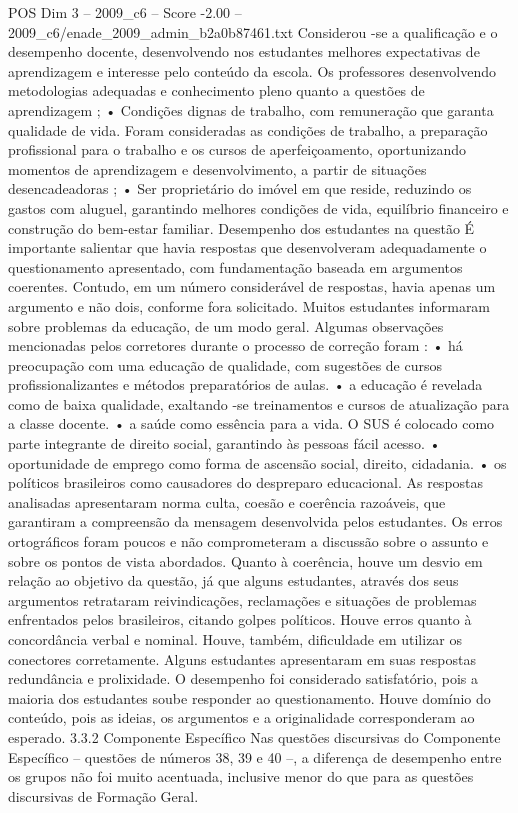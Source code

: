 \begin{textsample}{POS Dim 3 – 2009\_c6 – Score -2.00 – 2009\_c6/enade\_2009\_admin\_b2a0b87461.txt}
Considerou -se a qualificação e o desempenho docente, desenvolvendo nos estudantes melhores expectativas de aprendizagem e interesse pelo conteúdo da escola.
Os professores desenvolvendo metodologias adequadas e conhecimento pleno quanto a questões de aprendizagem ; • Condições dignas de trabalho, com remuneração que garanta qualidade de vida.
Foram consideradas as condições de trabalho, a preparação profissional para o trabalho e os cursos de aperfeiçoamento, oportunizando momentos de aprendizagem e desenvolvimento, a partir de situações desencadeadoras ; • Ser proprietário do imóvel em que reside, reduzindo os gastos com aluguel, garantindo melhores condições de vida, equilíbrio financeiro e construção do bem-estar familiar.
Desempenho dos estudantes na questão É importante salientar que havia respostas que desenvolveram adequadamente o questionamento apresentado, com fundamentação baseada em argumentos coerentes.
Contudo, em um número considerável de respostas, havia apenas um argumento e não dois, conforme fora solicitado.
Muitos estudantes informaram sobre problemas da educação, de um modo geral.
Algumas observações mencionadas pelos corretores durante o processo de correção foram : • há preocupação com uma educação de qualidade, com sugestões de cursos profissionalizantes e métodos preparatórios de aulas. • a educação é revelada como de baixa qualidade, exaltando -se treinamentos e cursos de atualização para a classe docente. • a saúde como essência para a vida.
O SUS é colocado como parte integrante de direito social, garantindo às pessoas fácil acesso. • oportunidade de emprego como forma de ascensão social, direito, cidadania. • os políticos brasileiros como causadores do despreparo educacional.
As respostas analisadas apresentaram norma culta, coesão e coerência razoáveis, que garantiram a compreensão da mensagem desenvolvida pelos estudantes.
Os erros ortográficos foram poucos e não comprometeram a discussão sobre o assunto e sobre os pontos de vista abordados.
Quanto à coerência, houve um desvio em relação ao objetivo da questão, já que alguns estudantes, através dos seus argumentos retrataram reivindicações, reclamações e situações de problemas enfrentados pelos brasileiros, citando golpes políticos.
Houve erros quanto à concordância verbal e nominal.
Houve, também, dificuldade em utilizar os conectores corretamente.
Alguns estudantes apresentaram em suas respostas redundância e prolixidade.
O desempenho foi considerado satisfatório, pois a maioria dos estudantes soube responder ao questionamento.
Houve domínio do conteúdo, pois as ideias, os argumentos e a originalidade corresponderam ao esperado. 3.3.2 Componente Específico Nas questões discursivas do Componente Específico – questões de números 38, 39 e 40 –, a diferença de desempenho entre os grupos não foi muito acentuada, inclusive menor do que para as questões discursivas de Formação Geral.

\end{textsample}
